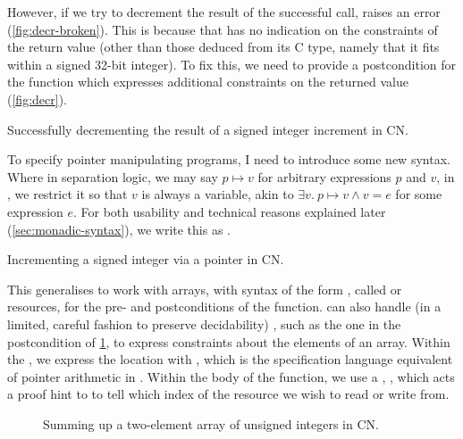 However, if we try to decrement the result of the successful call, 
raises an error (\cref{fig:decr-broken}). This is because that  has no
indication on the constraints of the return value (other than those deduced
from its C type, namely that it fits within a signed 32-bit integer). To fix
this, we need to provide a postcondition for the function which
expresses additional constraints on the returned value (\cref{fig:decr}).

\begin{marginfigure}
    \centering
    \caption{Successfully decrementing the result of a signed integer increment
        in CN.}\label{fig:decr}
\end{marginfigure}

To specify pointer manipulating programs, I need to introduce some new syntax.
Where in separation logic, we may say $p \mapsto v$ for arbitrary expressions
$p$ and $v$, in , we restrict it so that $v$ is always a variable, akin
to $\exists{} v.\ p \mapsto v \wedge v = e$ for some expression $e$. For both
usability and technical reasons explained later (\cref{sec:monadic-syntax}), we
write this as . %

\begin{marginfigure}
    \centering
    \caption{Incrementing a signed integer via a pointer in CN.}\label{fig:owned-incr}
\end{marginfigure}

This generalises to work with arrays, with syntax of the form
, %
called  or  resources, for the pre- and
postconditions of the function.  can also handle (in a limited, careful
fashion to preserve decidability) , such as the
one in the postcondition of \cref{fig:owned-array}, to express constraints
about the elements of an array. Within the , we express the
location with , which is the specification language %
equivalent of pointer arithmetic in . Within the body of the
function, we use a , ,
which acts a proof hint to  to tell which index of the 
resource we wish to read or write from.

\begin{figure}[tp]
    \centering
    \begin{minipage}{1.5\textwidth}
    \end{minipage}
    \caption{Summing up a two-element array of unsigned integers in
        CN.}\label{fig:owned-array}
\end{figure}

